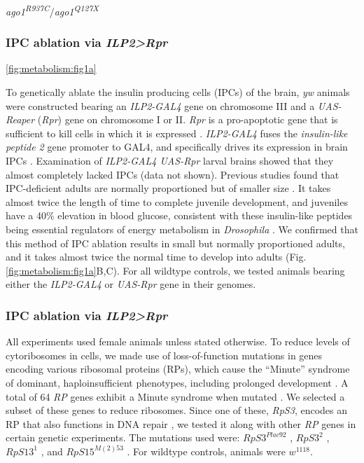 \textit{ago1\textsuperscript{R937C}}/\textit{ago1\textsuperscript{Q127X}}





\subsubsection{IPC ablation via \textit{ILP2>Rpr}}
\label{appendix:methods:metabolism:ipc_ablation}

\ref{fig:metabolism:fig1a}

To genetically ablate the insulin producing cells (IPCs) of the brain, \textit{yw} animals were constructed bearing an \textit{ILP2-GAL4} gene on chromosome III and a \textit{UAS-Reaper} (\textit{Rpr}) gene on chromosome I or II. \textit{Rpr} is a pro-apoptotic gene that is sufficient to kill cells in which it is expressed \cite{Lohmann2002}. \textit{ILP2-GAL4} fuses the \textit{insulin-like peptide 2} gene promoter to GAL4, and specifically drives its expression in brain IPCs \cite{Rulifson2002}. Examination of \textit{ILP2-GAL4 UAS-Rpr} larval brains showed that they almost completely lacked IPCs (data not shown). Previous studies found that IPC-deficient adults are normally proportioned but of smaller size \cite{Rulifson2002}. It takes almost twice the length of time to complete juvenile development, and juveniles have a 40\% elevation in blood glucose, consistent with these insulin-like peptides being essential regulators of energy metabolism in \textit{Drosophila} \cite{Rulifson2002}. We confirmed that this method of IPC ablation results in small but normally proportioned adults, and it takes almost twice the normal time to develop into adults (Fig. \ref{fig:metabolism:fig1a}B,C). For all wildtype controls, we tested animals bearing either the \textit{ILP2-GAL4} or \textit{UAS-Rpr} gene in their genomes.

\subsubsection{IPC ablation via \textit{ILP2>Rpr}}
\label{appendix:methods:metabolism:ipc_ablation}

All experiments used female animals unless stated otherwise. To reduce levels of cytoribosomes in cells, we made use of loss-of-function mutations in genes encoding various ribosomal proteins (RPs), which cause the ``Minute'' syndrome of dominant, haploinsufficient phenotypes, including prolonged development \cite{SaboeLarssen1998}. A total of 64 \textit{RP} genes exhibit a Minute syndrome when mutated \cite{Marygold2007}. We selected a subset of these genes to reduce ribosomes. Since one of these, \textit{RpS3}, encodes an RP that also functions in DNA repair \cite{Graifer2014}, we tested it along with other \textit{RP} genes in certain genetic experiments. The mutations used were: $RpS3^{Plac92}$ \cite{SaboeLarssen1998}, $RpS3^{2}$ \cite{Ferrus1975}, $RpS13^{1}$ \cite{SaboeLarssen1998}, and $RpS15^{M(2)53}$ \cite{Golic1996}. For wildtype controls, animals were $w^{1118}$.

